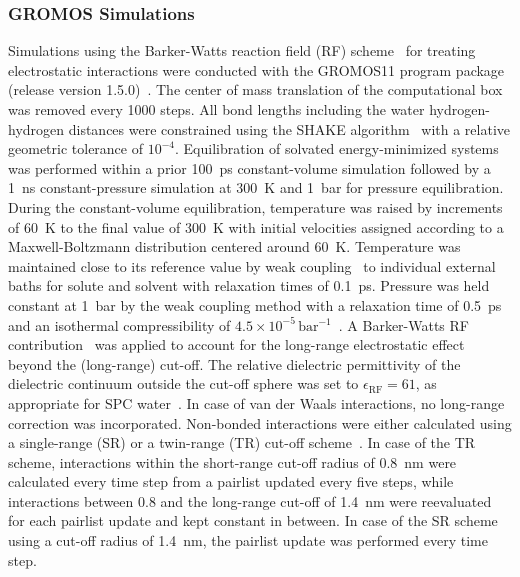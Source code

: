 \documentclass[9pt,lessons,pubversion]{livecoms}
\begin{document}
\subsubsection*{GROMOS Simulations}

Simulations using the Barker-Watts reaction field (RF) scheme~\cite{barker1973monte}  for treating electrostatic interactions 
were conducted with the GROMOS11 program package (release version 1.5.0)~\cite{kunz2012new, riniker2011calculation, schmid2012architecture}.
The center of mass translation of the computational box was removed every 1000 steps.
All bond lengths including the water hydrogen-hydrogen distances were constrained using the SHAKE algorithm~\cite{ryckaert1977numerical} with a relative geometric tolerance of $10^{-4}$.
Equilibration of solvated energy-minimized systems was performed within a prior 100~ps constant-volume simulation followed by a 1~ns constant-pressure simulation at 300~K and 1~bar for pressure equilibration.
During the constant-volume equilibration, temperature was raised by increments of 60~K to the final value of 300~K %
with initial velocities assigned according to a Maxwell-Boltzmann distribution centered around 60~K.
Temperature was maintained close to its reference value by weak coupling~\cite{berendsen1984molecular} to individual external baths for solute and solvent with relaxation times of 0.1~ps.
Pressure was held constant at 1~bar by the weak coupling method with a relaxation time of 0.5~ps and an isothermal compressibility of $4.5\times 10^{-5}\,\mathrm{bar^{-1}}$~\cite{kell1967precise}. 
A Barker-Watts RF contribution~\cite{barker1973monte} was applied to account for the long-range electrostatic effect beyond the (long-range) cut-off.
The relative dielectric permittivity of the dielectric continuum outside the cut-off sphere was set to $\epsilon_\mathrm{RF} = 61$, as appropriate for SPC water~\cite{heinz2001comparison}.
In case of van der Waals interactions, no long-range correction was incorporated.
%
Non-bonded interactions were either calculated using a single-range (SR) or a twin-range (TR) cut-off scheme~\cite{zuiderweg1985determination}.
In case of the TR scheme, interactions within the short-range cut-off radius of 0.8~nm were calculated every time step from a pairlist updated every five steps, 
while interactions between 0.8 and the long-range cut-off of 1.4~nm were reevaluated for each pairlist update and kept constant in between.
In case of the SR scheme using a cut-off radius of 1.4~nm, the pairlist update was performed every time step.
\end{document}
